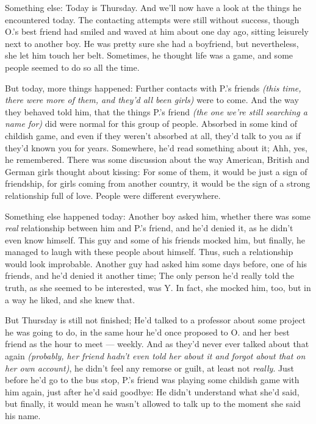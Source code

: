 Something else: Today is Thursday. 
And we'll now have a look at the things he encountered today. The contacting attempts were still without success, though O.'s best friend had smiled and waved at him about one day ago, sitting leisurely next to another boy. He was pretty sure she had a boyfriend, but nevertheless, she let him touch her belt. 
Sometimes, he thought life was a game, and some people seemed to do so all the time.

But today, more things happened: Further contacts with P.'s friends \emph{(this time, there were more of them, and they'd all been girls)} were to come. 
And the way they behaved told him, that the things P.'s friend \emph{(the one we're still searching a name for)} did were normal for this group of people. 
Absorbed in some kind of childish game, and even if they weren't absorbed at all, they'd talk to you as if they'd known you for years. Somewhere, he'd read something about it; Ahh, yes, he remembered. There was some discussion about the way American, British and German girls thought about kissing: For some of them, it would be just a sign of friendship, for girls coming from another country, it would be the sign of a strong relationship full of love. 
People were different everywhere.

Something else happened today: Another boy asked him, whether there was some \emph{real} relationship between him and P.'s friend, and he'd denied it, as he didn't even know himself. This guy and some of his friends mocked him, but finally, he managed to laugh with these people about himself. Thus, such a relationship would look improbable. 
Another guy had asked him some days before, one of his friends, and he'd denied it another time; The only person he'd really told the truth, as she seemed to be interested, was Y. 
In fact, she mocked him, too, but in a way he liked, and she knew that.

But Thursday is still not finished; He'd talked to a professor about some project he was going to do, in the same hour he'd once proposed to O. and her best friend as the hour to meet --- weekly. And as they'd never ever talked about that again \emph{(probably, her friend hadn't even told her about it and forgot about that on her own account)}, he didn't feel any remorse or guilt, at least not \emph{really}. 
Just before he'd go to the bus stop, P.'s friend was playing some childish game with him again, just after he'd said goodbye: He didn't understand what she'd said, but finally, it would mean he wasn't allowed to talk up to the moment she said his name.

